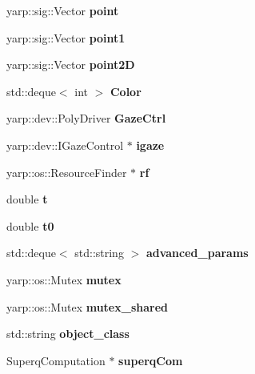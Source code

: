 \begin{DoxyCompactItemize}
\item 
yarp\-::sig\-::\-Vector {\bfseries point}\label{classSuperqModule_a80128e303c0d59016e41493ca50cc94e}

\item 
yarp\-::sig\-::\-Vector {\bfseries point1}\label{classSuperqModule_ab8daf379295df5a47ced6f06acfe0df9}

\item 
yarp\-::sig\-::\-Vector {\bfseries point2\-D}\label{classSuperqModule_a8839fda8369d4e2e73714cc1db6e0f5e}

\item 
std\-::deque$<$ int $>$ {\bfseries Color}\label{classSuperqModule_a15f7523202cf192d71f188db2647e50c}

\item 
yarp\-::dev\-::\-Poly\-Driver {\bfseries Gaze\-Ctrl}\label{classSuperqModule_a1ce22879df6c4586ed72a3e3b67609bb}

\item 
yarp\-::dev\-::\-I\-Gaze\-Control $\ast$ {\bfseries igaze}\label{classSuperqModule_a00ea631bed0909310e2e505f0aca688f}

\item 
yarp\-::os\-::\-Resource\-Finder $\ast$ {\bfseries rf}\label{classSuperqModule_ac781b86f89aab354c250c17cff49c2d8}

\item 
double {\bfseries t}\label{classSuperqModule_a7246f334af9922695d716a5afb4ce89e}

\item 
double {\bfseries t0}\label{classSuperqModule_aa0788b39ee666e4cd09ea4c59421dc24}

\item 
std\-::deque$<$ std\-::string $>$ {\bfseries advanced\-\_\-params}\label{classSuperqModule_aa45e8a64fbe20bc54d9f303369a618aa}

\item 
yarp\-::os\-::\-Mutex {\bfseries mutex}\label{classSuperqModule_a04543bfe968184ff3ee55905c90f12ac}

\item 
yarp\-::os\-::\-Mutex {\bfseries mutex\-\_\-shared}\label{classSuperqModule_aa6671c2457e2044f3823d671a9b7e6ea}

\item 
std\-::string {\bfseries object\-\_\-class}\label{classSuperqModule_ae26497c030a1ecd16b98096c5842f383}

\item 
Superq\-Computation $\ast$ {\bfseries superq\-Com}\label{classSuperqModule_adab3d841bcfd52387bb6dd861fddf424}


\end{DoxyCompactItemize}
